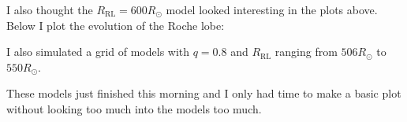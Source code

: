 \documentclass[a4paper,10pt]{article}
\begin{document}
I also thought the \(R_\text{RL} = 600R_\odot \) model looked interesting in the plots above. Below I plot the evolution of the Roche lobe:

\begin{figure}[ht]
    \centering
\end{figure}


I also simulated a grid of models with \(q=0.8\) and \(R_\text{RL}\) ranging from \(506R_\odot \) to \(550R_\odot \).

These models just finished this morning and I only had time to make a basic plot without looking too much into the models too much.
\begin{figure}[ht]
    \centering
\end{figure}



\end{document}
